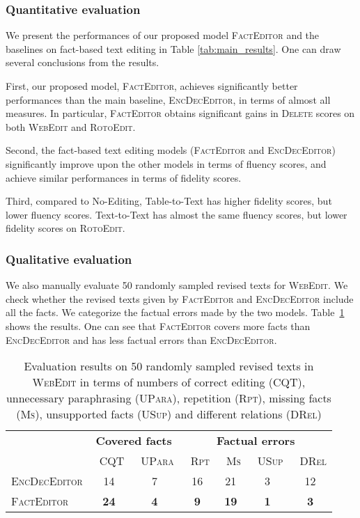 \documentclass[11pt,a4paper]{article}
\begin{document}
\subsubsection*{Quantitative evaluation}
We present the performances of our proposed model \textsc{FactEditor} and the baselines on fact-based text editing in Table \ref{tab:main_results}. One can draw several conclusions from the results.

First, our proposed model, \textsc{FactEditor}, achieves significantly better performances than the main baseline, \textsc{EncDecEditor}, in terms of almost all measures. In particular, \textsc{FactEditor} obtains significant gains in \textsc{Delete} scores on both \textsc{WebEdit} and \textsc{RotoEdit}.

Second, the fact-based text editing models (\textsc{FactEditor} and \textsc{EncDecEditor}) significantly improve upon the other models in terms of fluency scores, and achieve similar performances in terms of fidelity scores.

Third, compared to No-Editing, Table-to-Text has higher fidelity scores, but lower fluency scores. Text-to-Text has almost the same fluency scores, but lower fidelity scores on \textsc{RotoEdit}.


\subsubsection*{Qualitative evaluation}
We also manually evaluate 50 randomly sampled revised texts for \textsc{WebEdit}. We check whether the revised texts given by \textsc{FactEditor} and \textsc{EncDecEditor} include all the facts. We categorize the factual errors made by the two models. Table~\ref{tab:error} shows the results. One can see that \textsc{FactEditor} covers more facts than \textsc{EncDecEditor} and has less factual errors than \textsc{EncDecEditor}. 

\begin{table}[t]
    \centering
    \scriptsize
    \setlength\tabcolsep{2.5pt}
    \begin{tabular}{l|cc|cccc}
        \toprule
        & \multicolumn{2}{c|}{\textbf{Covered facts}} & \multicolumn{4}{c}{\textbf{Factual errors}}\\
        & ~\textsc{CQT}  & ~\textsc{UPara} & ~\textsc{Rpt} & ~\textsc{Ms} & ~\textsc{USup} & ~\textsc{DRel} \\\midrule
        \textsc{EncDecEditor}& 14 & 7 & 16 & 21 & 3 & 12\\
        \textsc{FactEditor} & \textbf{24} & \textbf{4} & \textbf{9} &\textbf{19} &\textbf{1} &\textbf{3}\\
        \bottomrule
    \end{tabular}
    \caption{Evaluation results on 50 randomly sampled revised texts in \textsc{WebEdit} in terms of numbers of correct editing (\textsc{CQT}), unnecessary paraphrasing (\textsc{UPara}),  repetition (\textsc{Rpt}), missing facts (\textsc{Ms}), unsupported facts (\textsc{USup}) and different relations (\textsc{DRel})}
    \label{tab:error}
\end{table}
\end{document}

